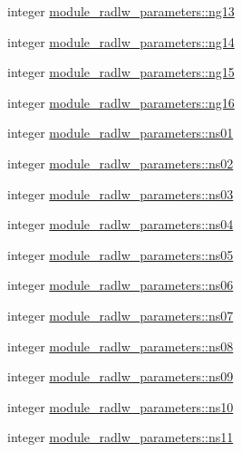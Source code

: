 \begin{DoxyCompactItemize}
\item 
integer \hyperlink{namespacemodule__radlw__parameters_a30e06652ca51875c17e56138eade5add}{module\+\_\+radlw\+\_\+parameters\+::ng13}
\item 
integer \hyperlink{namespacemodule__radlw__parameters_a32a603592af43d9de953c983a4e2f8c8}{module\+\_\+radlw\+\_\+parameters\+::ng14}
\item 
integer \hyperlink{namespacemodule__radlw__parameters_a1401bb43dbe665c21a17276cd82f4859}{module\+\_\+radlw\+\_\+parameters\+::ng15}
\item 
integer \hyperlink{namespacemodule__radlw__parameters_af6c5d2407ab29bb09fd2c297d4524e74}{module\+\_\+radlw\+\_\+parameters\+::ng16}
\item 
integer \hyperlink{namespacemodule__radlw__parameters_a0f82508bbb4039ebbc3fcb68e8e4e699}{module\+\_\+radlw\+\_\+parameters\+::ns01}
\item 
integer \hyperlink{namespacemodule__radlw__parameters_a8b13d877f08e7c26333285fd1db19d4e}{module\+\_\+radlw\+\_\+parameters\+::ns02}
\item 
integer \hyperlink{namespacemodule__radlw__parameters_a987d257f8e2f0743e92055be94424401}{module\+\_\+radlw\+\_\+parameters\+::ns03}
\item 
integer \hyperlink{namespacemodule__radlw__parameters_a57f85389c924ba16fad61578170eadcc}{module\+\_\+radlw\+\_\+parameters\+::ns04}
\item 
integer \hyperlink{namespacemodule__radlw__parameters_a6bb5413129239f08596d4e7233c666a5}{module\+\_\+radlw\+\_\+parameters\+::ns05}
\item 
integer \hyperlink{namespacemodule__radlw__parameters_ab936172cdf831f0b956c1475f175eca2}{module\+\_\+radlw\+\_\+parameters\+::ns06}
\item 
integer \hyperlink{namespacemodule__radlw__parameters_ac60030c5a4655c6cee7be71dd527ffdc}{module\+\_\+radlw\+\_\+parameters\+::ns07}
\item 
integer \hyperlink{namespacemodule__radlw__parameters_a0a9944341bfe4507370bb6b617ac0476}{module\+\_\+radlw\+\_\+parameters\+::ns08}
\item 
integer \hyperlink{namespacemodule__radlw__parameters_a8948c9fe0a0f209c62e17e7c526940b8}{module\+\_\+radlw\+\_\+parameters\+::ns09}
\item 
integer \hyperlink{namespacemodule__radlw__parameters_a66d1bbe720448a035ccf689d77418cd5}{module\+\_\+radlw\+\_\+parameters\+::ns10}
\item 
integer \hyperlink{namespacemodule__radlw__parameters_ace01958b71c7f6923fd9b3ba39b3b668}{module\+\_\+radlw\+\_\+parameters\+::ns11}

\end{DoxyCompactItemize}
